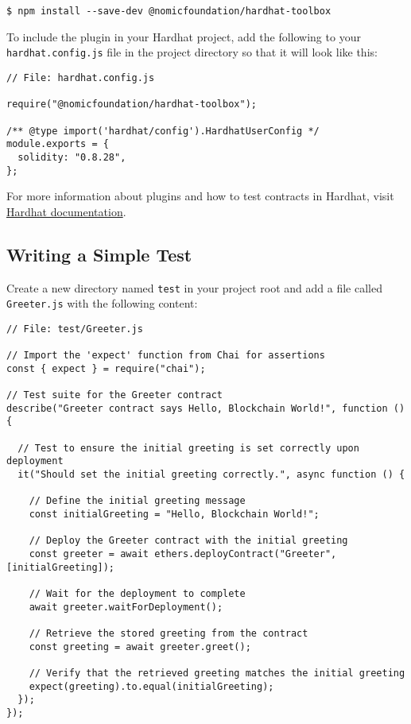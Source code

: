 \documentclass[12pt]{article}
\begin{document}
\begin{verbatim}
$ npm install --save-dev @nomicfoundation/hardhat-toolbox
\end{verbatim}

\noindent
To include the plugin in your Hardhat project, add the following to your \texttt{hardhat.config.js} file in the project directory so that it will look like this:

\begin{verbatim}
// File: hardhat.config.js

require("@nomicfoundation/hardhat-toolbox");

/** @type import('hardhat/config').HardhatUserConfig */
module.exports = {
  solidity: "0.8.28",
};
\end{verbatim}
For more information about plugins and how to test contracts in Hardhat, visit
\\ \href{https://hardhat.org/tutorial/testing-contracts}{Hardhat
    documentation}.

\subsection{Writing a Simple Test}

Create a new directory named \texttt{test} in your project root and add a file
called \texttt{Greeter.js} with the following content:

\noindent
\begin{minipage}[c]{\textwidth}
    \begin{verbatim}
// File: test/Greeter.js

// Import the 'expect' function from Chai for assertions
const { expect } = require("chai");

// Test suite for the Greeter contract
describe("Greeter contract says Hello, Blockchain World!", function () {
  
  // Test to ensure the initial greeting is set correctly upon deployment
  it("Should set the initial greeting correctly.", async function () {
    
    // Define the initial greeting message
    const initialGreeting = "Hello, Blockchain World!";
    
    // Deploy the Greeter contract with the initial greeting
    const greeter = await ethers.deployContract("Greeter", [initialGreeting]);
    
    // Wait for the deployment to complete
    await greeter.waitForDeployment();

    // Retrieve the stored greeting from the contract
    const greeting = await greeter.greet();

    // Verify that the retrieved greeting matches the initial greeting
    expect(greeting).to.equal(initialGreeting);
  });
});
\end{verbatim}
\end{minipage}
\end{document}
